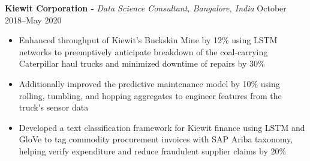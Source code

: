 \textbf{Kiewit Corporation -} \textit{Data Science Consultant, Bangalore, India} \hfill October 2018--May 2020\par

\begin{itemize}
	\item Enhanced throughput of Kiewit's Buckskin Mine by 12\% using LSTM networks to preemptively anticipate breakdown of the coal-carrying Caterpillar haul trucks and minimized downtime of repairs by 30\%
	\item Additionally improved the predictive maintenance model by 10\% using rolling, tumbling, and hopping aggregates to engineer features from the truck's sensor data
	\item Developed a text classification framework for Kiewit finance using LSTM and GloVe to tag commodity procurement invoices with SAP Ariba taxonomy, helping verify expenditure and reduce fraudulent supplier claims by 20\%
\end{itemize}\par